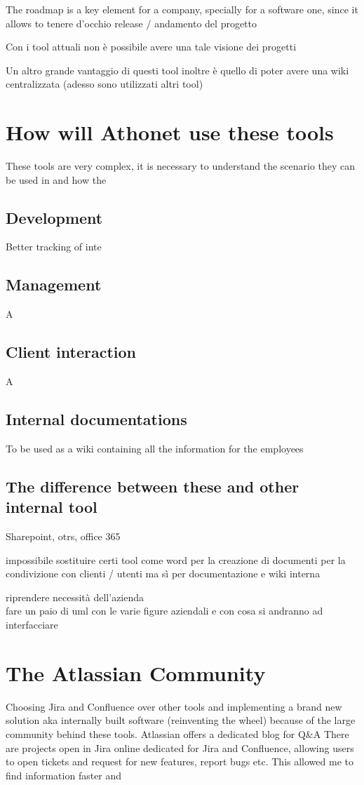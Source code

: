 	The roadmap is a key element for a company, specially for a software one, since it allows to tenere d'occhio release / andamento del progetto

	Con i tool attuali non è possibile avere una tale visione dei progetti
	
	Un altro grande vantaggio di questi tool inoltre è quello di poter avere una wiki centralizzata (adesso sono utilizzati altri tool)

\section{How will Athonet use these tools}

	These tools are very complex, it is necessary to understand the scenario they can be used in and how the

	\subsection{Development} 
		Better tracking of inte
	
	\subsection{Management} 
		A
	
	\subsection{Client interaction} 
		A
		
	\subsection{Internal documentations}
		To be used as a wiki containing all the information for the employees
		
	\subsection{The difference between these and other internal tool}
		Sharepoint, otrs, office 365
		
		impossibile sostituire certi tool come word per la creazione di documenti per la condivizione con clienti / utenti ma sì per documentazione e wiki interna

riprendere necessità dell'azienda\\
fare un paio di uml con le varie figure aziendali e con cosa si andranno ad interfacciare

\section{The Atlassian Community}
	Choosing Jira and Confluence over other tools and implementing a brand new solution aka internally built software (reinventing the wheel) 
	because of the large community behind these tools.
	Atlassian offers a dedicated blog for Q\&A
	There are projects open in Jira online dedicated for Jira and Confluence, allowing users to open tickets and request for new features, report bugs etc.
	This allowed me to find information faster and 
